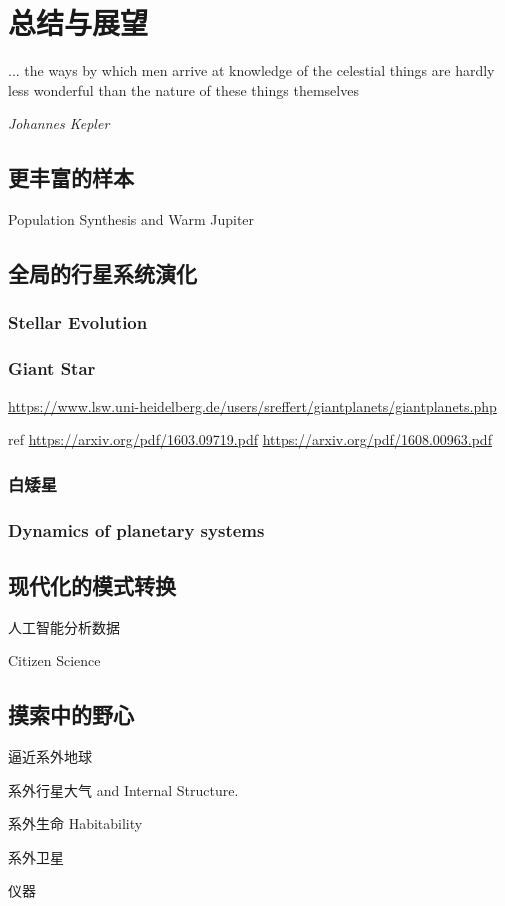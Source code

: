 \chapter{总结与展望} \label{chapter:conclusion}

\epigraph{... the ways by which men arrive at knowledge of the celestial things are hardly less wonderful than the nature of these things themselves}{\textit{Johannes Kepler}}

\section{更丰富的样本}

Population Synthesis and Warm Jupiter

\section{全局的行星系统演化} \label{sec:fateofplanets}

\subsection{Stellar Evolution} 

\subsection{Giant Star}  \label{sec:hjofgiants}

\url{https://www.lsw.uni-heidelberg.de/users/sreffert/giantplanets/giantplanets.php}

ref
\url{https://arxiv.org/pdf/1603.09719.pdf}
\url{https://arxiv.org/pdf/1608.00963.pdf}


\subsection{白矮星}

\subsection{Dynamics of planetary systems}

\section{现代化的模式转换}

人工智能分析数据

Citizen Science

\section{摸索中的野心}

逼近系外地球

系外行星大气 and Internal Structure.

系外生命 Habitability

系外卫星

仪器





